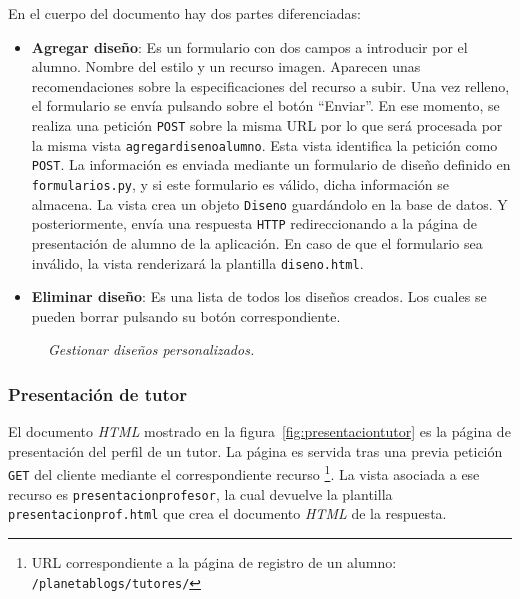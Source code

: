 \documentclass[a4paper, 12pt]{book}
\begin{document}
En el cuerpo del documento hay dos partes diferenciadas: 
\begin{itemize}
  \item {\bfseries Agregar dise\~no}: Es un formulario con dos campos a introducir por el alumno. Nombre del estilo y un recurso imagen. Aparecen unas recomendaciones sobre 
  la especificaciones del recurso a subir. Una vez relleno, el formulario se env\'ia pulsando sobre el bot\'on ``Enviar''. En ese momento, se realiza una petici\'on \texttt{POST} sobre la 
  misma URL por lo que ser\'a procesada por la misma vista \texttt{agregardisenoalumno}. Esta vista identifica la petici\'on como \texttt{POST}. La informaci\'on es enviada mediante un 
  formulario de dise\~no definido en \texttt{formularios.py}, y si este formulario es v\'alido, dicha informaci\'on se almacena. La vista crea un objeto \texttt{Diseno} guard\'andolo
  en la base de datos. Y posteriormente, env\'ia una respuesta \texttt{HTTP} redireccionando a la p\'agina de presentaci\'on de alumno de la aplicaci\'on. En caso de que el formulario 
  sea inv\'alido, la vista renderizar\'a la plantilla \texttt{diseno.html}.
  \item {\bfseries Eliminar dise\~no}: Es una lista de todos los dise\~nos creados. Los cuales se pueden borrar pulsando su bot\'on correspondiente.
\end{itemize}

\begin{figure}
  \centering
  \caption{\textit{Gestionar dise\~nos personalizados.}}
  \label{fig:persdiseno}
\end{figure}


\subsubsection{Presentaci\'on de tutor}
\label{sec:presentaciontutor}
El documento \textit{HTML} mostrado en la figura~\ref{fig:presentaciontutor} es la p\'agina de presentaci\'on del perfil de un tutor. La p\'agina es servida 
tras una previa petici\'on \texttt{GET} del cliente mediante el correspondiente recurso \footnote{URL correspondiente a la p\'agina de registro de un alumno: 
\texttt{/planetablogs/tutores/}}. La vista asociada a ese recurso es \texttt{presentacionprofesor}, la cual devuelve la plantilla 
\texttt{presentacionprof.html} que crea el documento \textit{HTML} de la respuesta.
\end{document}
